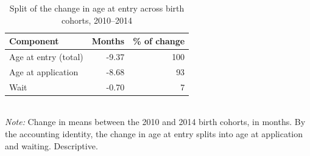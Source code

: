\begin{table}[htbp]\centering
\caption{Split of the change in age at entry across birth cohorts, 2010--2014}
\label{tab:S3b_split}
\small
\begin{tabular}{lrr}
\toprule
Component & Months & \% of change \\
\midrule
Age at entry (total) & -9.37 & 100 \\
\midrule
Age at application & -8.68 & 93 \\
Wait & -0.70 & 7 \\
\bottomrule
\end{tabular}
\\[3pt]{\footnotesize \textit{Note:} Change in means between the 2010 and 2014 birth cohorts, in months. By the accounting identity, the change in age at entry splits into age at application and waiting. Descriptive.}
\end{table}
